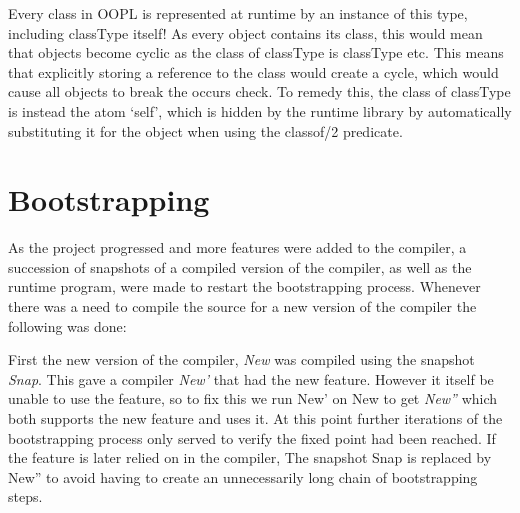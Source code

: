 \documentclass[12pt,a4paper,twoside,openright]{report}
\newcommand{\tblocktextnm}[4]{
    {#1} \& {#4}   \& {#2} \\
    {}     \&  {#3}   \&      \\
}
\newcommand{\tblockoutline}[1]{
    \draw (#1-1-1.south west) |- (#1-1-3.north east) |- (#1-1-3.south west) |- (#1-2-2.south west) |- (#1-1-1.south west);
}
\newcommand{\wblocktext}[1]{
    {#1} \\
    {}\\
}
\newcommand{\wblockoutline}[1]{
    \draw (#1-1-1.south west) |- (#1-1-1.north east) -- (#1-1-1.south east) -- (#1-2-1.south) -- (#1-1-1.south west);
}
\newcommand{\wsupt}[2]{
	\node(mac#2) at (#2-2-2.south west) [wblock, anchor = mac#2-1-1.north west] {\wblocktext{#1}};
	\wblockoutline{mac#2};
}
\begin{document}
Every class in OOPL is represented at runtime by an instance of this type, including classType itself! As every object contains its class, this would mean that objects become cyclic as the class of classType is classType etc. This means that explicitly storing a reference to the class would create  a cycle, which would cause all objects to break the occurs check. To remedy this, the class of classType is instead the atom `self', which is hidden by the runtime library by automatically substituting it for the object when using the classof/2 predicate.

\section{Bootstrapping}

As the project progressed and more features were added to the compiler, a succession of snapshots of a compiled version of the compiler, as well as the runtime program, were made to restart the bootstrapping process. Whenever there was a need to compile the source for a new version of the compiler the following was done:

\begin{center}
\end{center}

First the new version of the compiler, \emph{New} was compiled using the snapshot \emph{Snap}. This gave a compiler \emph{New'} that had the new feature. However it itself be unable to use the feature, so to fix this we run New' on New to get \emph{New''} which both supports the new feature and uses it. At this point further iterations of the bootstrapping process only served to verify the fixed point had been reached. If the feature is later relied on in the compiler, The snapshot Snap is replaced by New'' to avoid having to create an unnecessarily long chain of bootstrapping steps.
\end{document}
